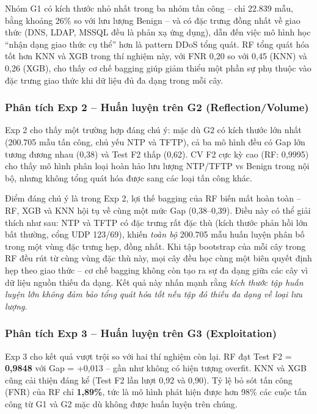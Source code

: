 Nhóm G1 có kích thước nhỏ nhất trong ba nhóm tấn công -- chỉ 22.839 mẫu, bằng khoảng 26\% so với lưu lượng Benign -- và có đặc trưng đồng nhất về giao thức (DNS, LDAP, MSSQL đều là phản xạ ứng dụng), dẫn đến việc mô hình học ``nhận dạng giao thức cụ thể'' hơn là pattern DDoS tổng quát. RF tổng quát hóa tốt hơn KNN và XGB trong thí nghiệm này, với FNR 0,20 so với 0,45 (KNN) và 0,26 (XGB), cho thấy cơ chế bagging giúp giảm thiểu một phần sự phụ thuộc vào đặc trưng giao thức khi dữ liệu đủ đa dạng trong mỗi cây.

\subsubsection{Phân tích Exp 2 -- Huấn luyện trên G2 (Reflection/Volume)}

Exp 2 cho thấy một trường hợp đáng chú ý: mặc dù G2 có kích thước lớn nhất (200.705 mẫu tấn công, chủ yếu NTP và TFTP), cả ba mô hình đều có Gap lớn tương đương nhau (0,38) và Test F2 thấp (0,62). CV F2 cực kỳ cao (RF: 0,9995) cho thấy mô hình phân loại hoàn hảo lưu lượng NTP/TFTP vs Benign trong nội bộ, nhưng không tổng quát hóa được sang các loại tấn công khác.

Điểm đáng chú ý là trong Exp 2, lợi thế bagging của RF biến mất hoàn toàn -- RF, XGB và KNN hội tụ về cùng một mức Gap (0,38--0,39). Điều này có thể giải thích như sau: NTP và TFTP có đặc trưng rất đặc thù (kích thước phản hồi lớn bất thường, cổng UDP 123/69), khiến \textit{toàn bộ} 200.705 mẫu huấn luyện phân bố trong một vùng đặc trưng hẹp, đồng nhất. Khi tập bootstrap của mỗi cây trong RF đều rút từ cùng vùng đặc thù này, mọi cây đều học cùng một biên quyết định hẹp theo giao thức -- cơ chế bagging không còn tạo ra sự đa dạng giữa các cây vì dữ liệu nguồn thiếu đa dạng. Kết quả này nhấn mạnh rằng \textit{kích thước tập huấn luyện lớn không đảm bảo tổng quát hóa tốt nếu tập đó thiếu đa dạng về loại lưu lượng}.

\subsubsection{Phân tích Exp 3 -- Huấn luyện trên G3 (Exploitation)}

Exp 3 cho kết quả vượt trội so với hai thí nghiệm còn lại. RF đạt Test F2 = \textbf{0,9848} với Gap = +0,013 -- gần như không có hiện tượng overfit. KNN và XGB cũng cải thiện đáng kể (Test F2 lần lượt 0,92 và 0,90). Tỷ lệ bỏ sót tấn công (FNR) của RF chỉ \textbf{1,89\%}, tức là mô hình phát hiện được hơn 98\% các cuộc tấn công từ G1 và G2 mặc dù không được huấn luyện trên chúng.

